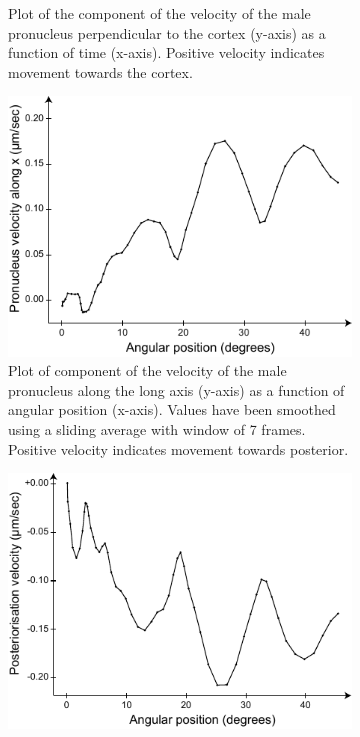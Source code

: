 \begin{figure}[h]
\begin{subfigure}[t]{0.45\textwidth}
    \caption{Plot of the component of the velocity of the male pronucleus perpendicular to the cortex (y-axis) as a function of time (x-axis). Positive velocity indicates movement towards the cortex.} 
    \label{subfig:malePronucleusTrackingVelocities-perpVelVsTime}
\end{subfigure}

\begin{subfigure}[t]{0.45\textwidth}
    \centering
    \includegraphics[width=\textwidth]{ExpMethods/FigTrackNucleus/vxVsAngleSmooth.pdf}
    \caption{Plot of component of the velocity of the male pronucleus along the long axis (y-axis) as a function of angular position (x-axis). Values have been smoothed using a sliding average with window of \num{7} frames. Positive velocity indicates movement towards posterior.} 
    \label{subfig:malePronucleusTrackingVelocities-vxVsAngleSmooth}
\end{subfigure}
\hfill
\begin{subfigure}[t]{0.45\textwidth}
    \centering
    \includegraphics[width=\textwidth]{ExpMethods/FigTrackNucleus/postVelVsAngleSmooth.pdf}

\end{subfigure}
\end{figure}
